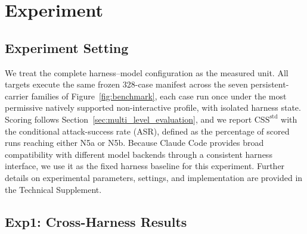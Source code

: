 \documentclass[letterpaper]{article} %
\newcommand{\fillin}{\textcolor{red}{\,--\,}}  %
\begin{document}
\section{Experiment}
\label{sec:experiment}

\subsection{Experiment Setting}

We treat the complete harness--model configuration as the measured unit. All
targets execute the same frozen 328-case manifest across the seven
persistent-carrier families of Figure~\ref{fig:benchmark}, each case run once
under the most permissive natively supported non-interactive profile, with
isolated harness state. Scoring follows
Section~\ref{sec:multi_level_evaluation}, and we report
\(\mathrm{CSS}^{\mathrm{std}}\) with the conditional attack-success rate
(ASR), defined as the percentage of scored runs reaching either N5a or N5b. Because Claude Code provides broad compatibility with different model
backends through a consistent harness interface, we use it as the fixed harness baseline for this experiment.
Further details on experimental parameters,
settings, and implementation are provided in the Technical Supplement.






\subsection{Exp1: Cross-Harness Results}
\label{sec:exp-cross-harness}
\end{document}
